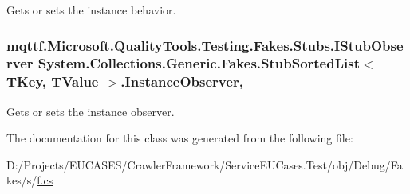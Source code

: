 Gets or sets the instance behavior.

\hypertarget{class_system_1_1_collections_1_1_generic_1_1_fakes_1_1_stub_sorted_list_3_01_t_key_00_01_t_value_01_4_a5855024f8530d1fcb877a598a5b300c5}{
\subsubsection[{Instance\-Observer}]{\setlength{\rightskip}{0pt plus 5cm}mqttf.\-Microsoft.\-Quality\-Tools.\-Testing.\-Fakes.\-Stubs.\-I\-Stub\-Observer System.\-Collections.\-Generic.\-Fakes.\-Stub\-Sorted\-List$<$ T\-Key, T\-Value $>$.Instance\-Observer\hspace{0.3cm}{\ttfamily [get]}, {\ttfamily [set]}}}\label{class_system_1_1_collections_1_1_generic_1_1_fakes_1_1_stub_sorted_list_3_01_t_key_00_01_t_value_01_4_a5855024f8530d1fcb877a598a5b300c5}


Gets or sets the instance observer.



The documentation for this class was generated from the following file\-:\begin{DoxyCompactItemize}
\item 
D\-:/\-Projects/\-E\-U\-C\-A\-S\-E\-S/\-Crawler\-Framework/\-Service\-E\-U\-Cases.\-Test/obj/\-Debug/\-Fakes/s/\hyperlink{s_2f_8cs}{f.\-cs}\end{DoxyCompactItemize}
